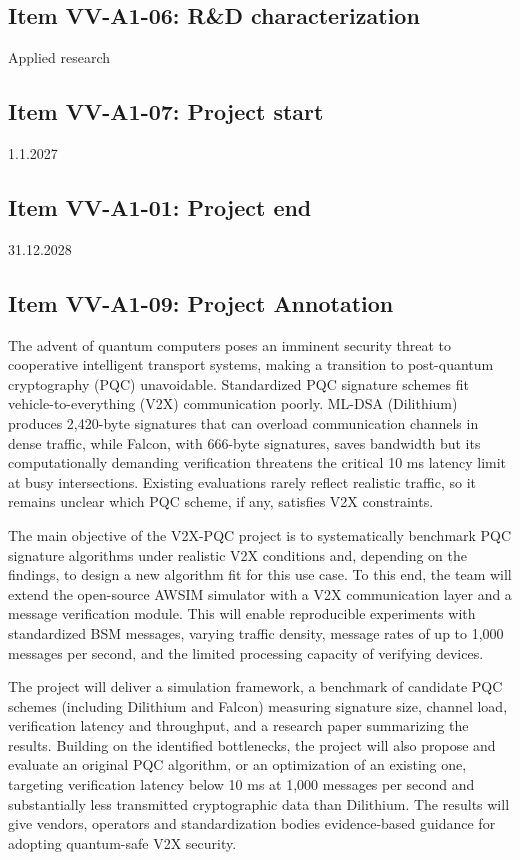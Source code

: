 \documentclass[11pt, a4paper]{article}
\begin{document}
\subsection*{Item VV-A1-06: R\&D characterization}
Applied research
\vspace{15pt}
\subsection*{Item VV-A1-07: Project start}
1.1.2027
\vspace{15pt}
\subsection*{Item VV-A1-01: Project end}
31.12.2028
\vspace{15pt}
\subsection*{Item VV-A1-09: Project Annotation}

The advent of quantum computers poses an imminent security threat to cooperative intelligent transport systems, making a transition to post-quantum cryptography (PQC) unavoidable. Standardized PQC signature schemes fit vehicle-to-everything (V2X) communication poorly. ML-DSA (Dilithium) produces 2,420-byte signatures that can overload communication channels in dense traffic, while Falcon, with 666-byte signatures, saves bandwidth but its computationally demanding verification threatens the critical 10 ms latency limit at busy intersections. Existing evaluations rarely reflect realistic traffic, so it remains unclear which PQC scheme, if any, satisfies V2X constraints.

\par
The main objective of the V2X-PQC project is to systematically benchmark PQC signature algorithms under realistic V2X conditions and, depending on the findings, to design a new algorithm fit for this use case. To this end, the team will extend the open-source AWSIM simulator with a V2X communication layer and a message verification module. This will enable reproducible experiments with standardized BSM messages, varying traffic density, message rates of up to 1,000 messages per second, and the limited processing capacity of verifying devices.

\par
The project will deliver a simulation framework, a benchmark of candidate PQC schemes (including Dilithium and Falcon) measuring signature size, channel load, verification latency and throughput, and a research paper summarizing the results. Building on the identified bottlenecks, the project will also propose and evaluate an original PQC algorithm, or an optimization of an existing one, targeting verification latency below 10 ms at 1,000 messages per second and substantially less transmitted cryptographic data than Dilithium. The results will give vendors, operators and standardization bodies evidence-based guidance for adopting quantum-safe V2X security.
\end{document}

